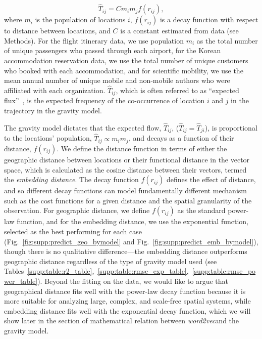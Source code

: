 \documentclass[12pt]{article} %
\begin{document}
\begin{equation}
	\label{eq:gravity_basic}
	\hat{T}_{ij} = Cm_{i}m_{j}f(r_{ij}),
\end{equation}
where $m_{i}$ is the population of locations $i$,  $f(r_{ij})$ is a decay function with respect to distance between locations, and $C$ is a constant estimated from data (see Methods).
For the flight itinerary data, we use population $m_{i}$ as the total number of unique passengers who passed through each airport, for the Korean accommodation reservation data, we use the total number of unique customers who booked with each accommodation, and for scientific mobility, we use the mean annual number of unique mobile and non-mobile authors who were affiliated with each organization.
$\hat{T}_{ij}$, which is often referred to as ``expected flux''~\autocite{simini2012universal}, is the expected frequency of the co-occurrence of location $i$ and $j$ in the trajectory in the gravity model.

The gravity model dictates that the expected flow, $\hat{T}_{ij}$, ($\hat{T}_{ij }= \hat{T}_{ji}$), is proportional to the locations' population, $\hat{T}_{ij} \propto m_{i} m_{j}$, and decays as a function of their distance, $f(r_{ij})$.
We define the distance function in terms of either the geographic distance between locations or their functional distance in the vector space, which is calculated as the cosine distance between their vectors, termed the \textit{embedding distance}.
The decay function $f(r_{ij})$ defines the effect of distance, and so different decay functions can model fundamentally different mechanism \autocite{barthelemy2011spatial} such as the cost functions for a given distance and the spatial granularity of the observation.
For geographic distance, we define $f(r_{ij})$ as the standard power-law function, and for the embedding distance, we use the exponential function, selected as the best performing for each case (Fig.~\ref{fig:supp:predict_geo_bymodel} and Fig.~\ref{fig:supp:predict_emb_bymodel}), though there is no qualitative difference---the embedding distance outperforms geographic distance regardless of the type of gravity model used (see Tables~\ref{supp:table:r2_table},~\ref{supp:table:rmse_exp_table},~\ref{supp:table:rmse_power_table}).
Beyond the fitting on the data, we would like to argue that geographical distance fits well with the power-law decay function because it is more suitable for analyzing large, complex, and scale-free spatial systems\autocite{chen2015distance}, while embedding distance fits well with the exponential decay function, which we will show later in the section of mathematical relation between \textit{word2vec}and the gravity model.
\end{document}
